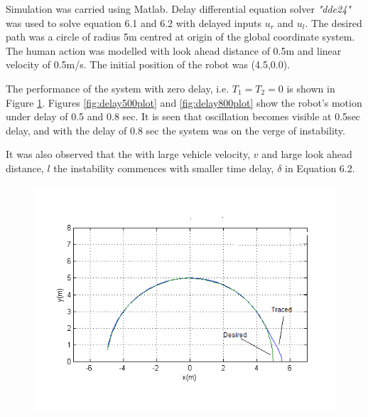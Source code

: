 Simulation was carried using Matlab. Delay differential equation solver \textit{"dde24"} was used to solve equation 6.1 and 6.2 with delayed inputs $u_r$ and $u_l$.  The desired path  was a circle of radius 5m centred at origin of the global coordinate system. The human action was modelled with look ahead distance of 0.5m and linear velocity of 0.5m/s. The initial position of the robot was (4.5,0.0).

 The  performance of the system with zero delay, i.e. $T_1=T_2=0$ is shown in Figure \ref{fig:nodelayplot}. Figures \ref{fig:delay500plot} and \ref{fig:delay800plot} show the   robot's motion under delay of 0.5 and 0.8 sec.  It is seen that oscillation becomes visible at 0.5sec delay, and with the delay of  0.8 sec the system was on the verge of instability. 
 
 It was also observed that the with large vehicle velocity, $v$ and large look ahead distance, $l$ the instability commences with smaller time delay, $\delta$ in Equation 6.2.  
\begin{figure}[h]
	\includegraphics[width=\linewidth,keepaspectratio]{Chapter6/fig/noDelay}
	\label{fig:nodelayplot} 
\end{figure} 
